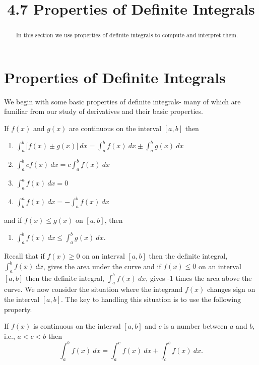\documentclass[handout]{ximera}
\title{4.7 Properties of Definite Integrals}
\begin{document}
\begin{abstract}
In this section we use properties of definite integrals to compute and interpret them.
\end{abstract}

\maketitle



\section{Properties of Definite Integrals}

We begin with some basic properties of definite integrals- many of which are familiar from our study of derivatives and their basic properties.

\begin{proposition}
If $f(x)$ and $g(x)$ are continuous on the interval $[a,b]$ then 
\begin{enumerate}
\item $\displaystyle{\int_a^b \Big[f(x) \pm g(x) \Big] \ dx = \int_a^b f(x) \ dx \pm \int_a^b g(x) \ dx}$
\item $\displaystyle{\int_a^b cf(x) \ dx = c\int_a^b f(x) \ dx}$
\item $\displaystyle{\int_a^a f(x) \ dx = 0}$
\item $\displaystyle{\int_b^a f(x) \ dx = -\int_a^b f(x) \ dx}$\\
\end{enumerate}
and if $f(x) \leq g(x)$ on $[a,b]$, then
\begin{enumerate}[resume]
\item $\displaystyle{\int_a^b f(x) \ dx \leq \int_a^b g(x) \ dx.}$
\end{enumerate}
\end{proposition}

Recall that if $f(x) \geq 0$ on an interval $[a, b]$ then the definite integral, $\int_a^b f(x) \ dx$,
gives the area under the curve and if $f(x) \leq 0$ on an interval $[a, b]$ then 
the definite integral, $\int_a^b f(x) \ dx$, gives -1 times the area above the curve. 
We now consider the situation where the integrand $f(x)$ changes sign on the interval $[a,b]$.
The key to handling this situation is to use the following property.
\begin{proposition}[Additivity]
If $f(x)$ is continuous on the interval $[a,b]$ and $c$ is a number between $a$ and $b$, i.e., $a<c<b$ then
\[\int_a^b f(x) \ dx = \int_a^c f(x) \ dx  + \int_c^b f(x) \ dx.\]
\end{proposition}
\end{document}
